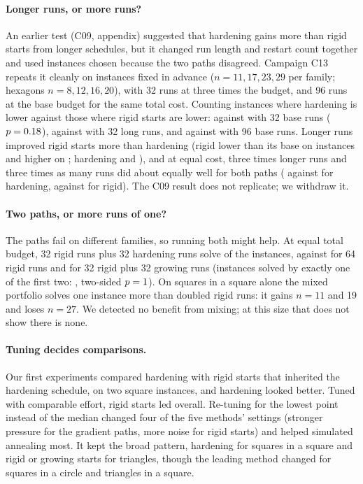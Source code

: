 

\paragraph{Longer runs, or more runs?} An earlier test (C09, appendix) suggested that hardening gains more than rigid starts from longer schedules, but it changed run length and restart count together and used instances chosen because the two paths disagreed. Campaign C13 repeats it cleanly on \BudN{} instances fixed in advance ($n=11,17,23,29$ per family; hexagons $n=8,12,16,20$), with 32 runs at three times the budget, and 96 runs at the base budget for the same total cost. Counting instances where hardening is lower against those where rigid starts are lower: \BudOneH{} against \BudOneR{} with 32 base runs ($p=0.18$), \BudThreeH{} against \BudThreeR{} with 32 long runs, and \BudMoreH{} against \BudMoreR{} with 96 base runs. Longer runs improved rigid starts more than hardening (rigid lower than its base on \BudGainR{} instances and higher on \BudLossR; hardening \BudGainH{} and \BudLossH), and at equal cost, three times longer runs and three times as many runs did about equally well for both paths (\BudLvMLH{} against \BudLvMMH{} for hardening, \BudLvMLR{} against \BudLvMMR{} for rigid). The C09 result does not replicate; we withdraw it.

\paragraph{Two paths, or more runs of one?} The paths fail on different families, so running both might help. At equal total budget, 32 rigid runs plus 32 hardening runs solve \PortRigidHarden{} of the \CsevenInstances{} instances, against \PortRigidSixtyFour{} for 64 rigid runs and \PortRigidGrow{} for 32 rigid plus 32 growing runs (instances solved by exactly one of the first two: \PortSign, two-sided $p=1$). On squares in a square alone the mixed portfolio solves one instance more than doubled rigid runs: it gains $n=11$ and 19 and loses $n=27$. We detected no benefit from mixing; at this size that does not show there is none.

\paragraph{Tuning decides comparisons.} Our first experiments compared hardening with rigid starts that inherited the hardening schedule, on two square instances, and hardening looked better. Tuned with comparable effort, rigid starts led overall. Re-tuning for the lowest point instead of the median changed four of the five methods' settings (stronger pressure for the gradient paths, more noise for rigid starts) and helped simulated annealing most. It kept the broad pattern, hardening for squares in a square and rigid or growing starts for triangles, though the leading method changed for squares in a circle and triangles in a square.
